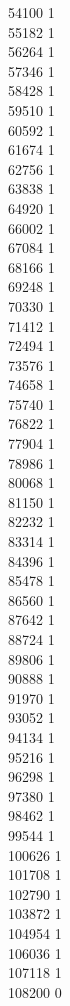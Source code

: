 { 54100	1 \\
 55182	1 \\
 56264	1 \\
 57346	1 \\
 58428	1 \\
 59510	1 \\
 60592	1 \\
 61674	1 \\
 62756	1 \\
 63838	1 \\
 64920	1 \\
 66002	1 \\
 67084	1 \\
 68166	1 \\
 69248	1 \\
 70330	1 \\
 71412	1 \\
 72494	1 \\
 73576	1 \\
 74658	1 \\
 75740	1 \\
 76822	1 \\
 77904	1 \\
 78986	1 \\
 80068	1 \\
 81150	1 \\
 82232	1 \\
 83314	1 \\
 84396	1 \\
 85478	1 \\
 86560	1 \\
 87642	1 \\
 88724	1 \\
 89806	1 \\
 90888	1 \\
 91970	1 \\
 93052	1 \\
 94134	1 \\
 95216	1 \\
 96298	1 \\
 97380	1 \\
 98462	1 \\
 99544	1 \\
 100626	1 \\
 101708	1 \\
 102790	1 \\
 103872	1 \\
 104954	1 \\
 106036	1 \\
 107118	1 \\
 108200	0 \\
}
